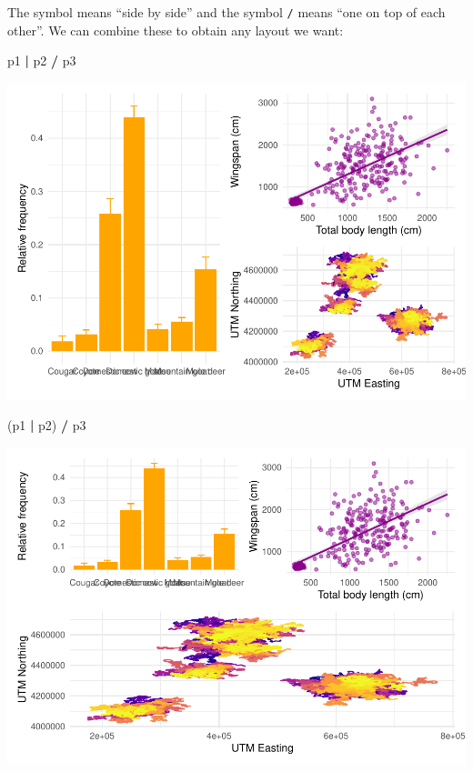 \documentclass[
]{book}
\newenvironment{Shaded}{\begin{snugshade}}{\end{snugshade}}
\newcommand{\NormalTok}[1]{#1}
\newcommand{\SpecialCharTok}[1]{\textcolor[rgb]{0.81,0.36,0.00}{\textbf{#1}}}
\begin{document}
The symbol \texttt{\textbar{}} means ``side by side'' and the symbol \texttt{/} means ``one on top of
each other''. We can combine these to obtain any layout we want:

\begin{Shaded}
\begin{Highlighting}[]
\NormalTok{p1 }\SpecialCharTok{|}\NormalTok{ p2 }\SpecialCharTok{/}\NormalTok{ p3}
\end{Highlighting}
\end{Shaded}

\includegraphics{reproducible-science_files/figure-latex/gg38-1.pdf}

\begin{Shaded}
\begin{Highlighting}[]
\NormalTok{(p1 }\SpecialCharTok{|}\NormalTok{ p2) }\SpecialCharTok{/}\NormalTok{ p3}
\end{Highlighting}
\end{Shaded}

\includegraphics{reproducible-science_files/figure-latex/gg38-2.pdf}
\end{document}
